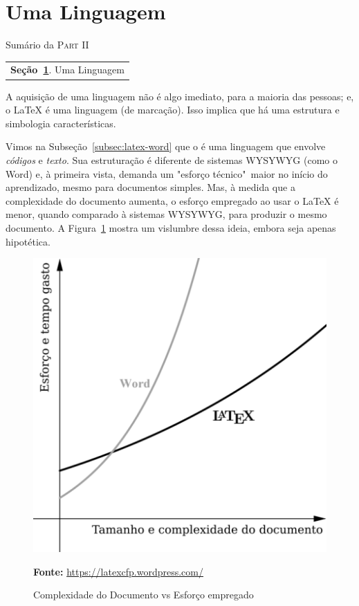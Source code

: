 \section{Uma Linguagem} %
\label{sec:aprendendo}

\begin{margintable}\vspace{.8in}\footnotesize
  \caption{Sumário da \textsc{Part II}}
  \medskip
  \begin{tabularx}{\marginparwidth}{|X}
    \textbf{\sffamily \textcolor{azulUFRB}{Seção}~\ref{sec:aprendendo}}.    {\sffamily Uma Linguagem} \\
  \end{tabularx}
\end{margintable}

A aquisição de uma linguagem não é algo imediato, para a maioria das pessoas; e,
o \LaTeX{} é uma linguagem (de marcação).
Isso implica que há uma \textsf{estrutura} e \textsf{simbologia} características.

Vimos na Subseção~\ref{subsec:latex-word} que o  é uma linguagem 
que envolve \textit{códigos} e \textit{texto}.
Sua estruturação é diferente de sistemas \textsf{WYSYWYG} (como o Word) e, à
primeira vista, demanda um "esforço técnico"\, maior no início do aprendizado, 
mesmo para documentos simples.
Mas, à medida que a complexidade do documento aumenta, o esforço empregado ao 
usar o \LaTeX{} é menor, quando comparado à sistemas \textsf{WYSYWYG}, para 
produzir o mesmo documento.
A Figura~\ref{fig:latex-vs-word} mostra um vislumbre dessa ideia, embora seja
apenas hipotética.

\begin{figure}[!htbp]
  \centering
  \caption{Complexidade do Documento vs Esforço empregado}
  \label{fig:latex-vs-word}
  \medskip
  \includegraphics[width = 0.6\linewidth]{figs/latex-vs-word.png}
  
  {\small \textbf{Fonte:} \url{https://latexcfp.wordpress.com/}}
\end{figure}

